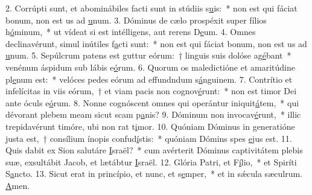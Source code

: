 2. Corrúpti sunt, et abominábiles facti sunt in stúdiis s\uline{u}is:~* non est qui fáciat bonum, non est us ad \uline{u}num.
3. Dóminus de cælo prospéxit super fílios h\uline{ó}minum,~* ut vídeat si est intélligens, aut rerens D\uline{e}um.
4. Omnes declinavérunt, simul inútiles f\uline{a}cti sunt:~* non est qui fáciat bonum, non est us ad \uline{u}num.
5. Sepúlcrum patens est guttur eórum:~† linguis suis dolóse ag\uline{é}bant~* venénum áspidum sub lábis e\uline{ó}rum.
6. Quorum os maledictióne et amaritúdine pl\uline{e}num est:~* velóces pedes eórum ad effundndum s\uline{á}nguinem.
7. Contrítio et infelícitas in viis eórum,~† et viam pacis non cognov\uline{é}runt:~* non est timor Dei ante óculs e\uline{ó}rum.
8. Nonne cognóscent omnes qui operántur iniquit\uline{á}tem,~* qui dévorant plebem meam sicut scam p\uline{a}nis?
9. Dóminum non invocav\uline{é}runt,~* illic trepidavérunt timóre, ubi non rat t\uline{i}mor.
10. Quóniam Dóminus in generatióne justa est,~† consílium ínopis confud\uline{í}stis:~* quóniam Dómins spes \uline{e}jus est.
11. Quis dabit ex Sion salutáre \uline{I}sraël?~* cum avérterit Dóminus captivitátem plebis suæ, exsultábit Jacob, et lætábtur \uline{I}sraël.
12. Glória Patri, et F\uline{í}lio,~* et Spiríti S\uline{a}ncto.
13. Sicut erat in princípio, et nunc, et s\uline{e}mper,~* et in sǽcula sæculrum. \uline{A}men.
